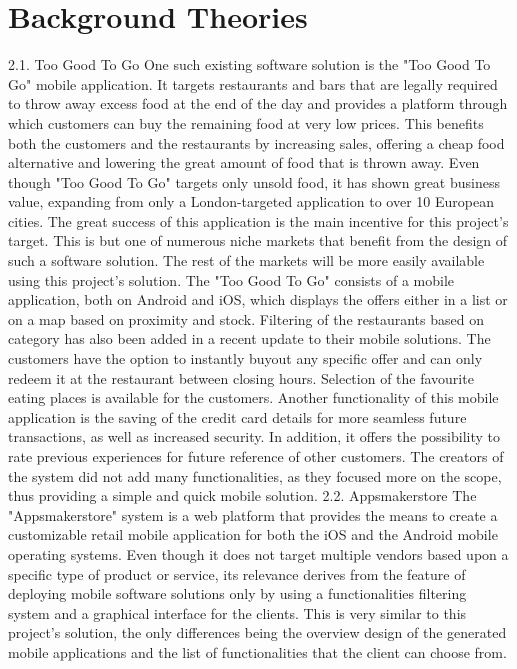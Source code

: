 \section{Background Theories} 

2.1. Too Good To Go
One such existing software solution is the "Too Good To Go" mobile application. It targets restaurants and bars that are legally required to throw away excess food at the end of the day and provides a platform through which customers can buy the remaining food at very low prices. This benefits both the customers and the restaurants by increasing sales, offering a cheap food alternative and lowering the great amount of food that is thrown away. Even though "Too Good To Go" targets only unsold food, it has shown great business value, expanding from only a London-targeted application to over 10 European cities. The great success of this application is the main incentive for this project's target. This is but one of numerous niche markets that benefit from the design of such a software solution. The rest of the markets will be more easily available using this project's solution.
The "Too Good To Go" consists of a mobile application, both on Android and iOS, which displays the offers either in a list or on a map based on proximity and stock. Filtering of the restaurants based on category has also been added in a recent update to their mobile solutions. The customers have the option to instantly buyout any specific offer and can only redeem it at the restaurant between closing hours. Selection of the favourite eating places is available for the customers. Another functionality of this mobile application is the saving of the credit card details for more seamless future transactions, as well as increased security. In addition, it offers the possibility to rate previous experiences for future reference of other customers. The creators of the system did not add many functionalities, as they focused more on the scope, thus providing a simple and quick mobile solution.
2.2. Appsmakerstore
The "Appsmakerstore" system is a web platform that provides the means to create a customizable retail mobile application for both the iOS and the Android mobile operating systems. Even though it does not target multiple vendors based upon a specific type of product or service, its relevance derives from the feature of deploying mobile software solutions only by using a functionalities filtering system and a graphical interface for the clients. This is very similar to this project's solution, the only differences being the overview design of the generated mobile applications and the list of functionalities that the client can choose from.
